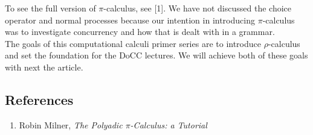 \documentclass[12pt]{article}
\numberwithin{equation}{section}
\begin{document}
To see the full version of $\pi$-calculus, see [1]. We have not discussed the choice operator and normal processes because our intention in introducing $\pi$-calculus was to investigate concurrency and how that is dealt with in a grammar. \\

The goals of this computational calculi primer series are to introduce $\rho$-calculus and set the foundation for the DoCC lectures. We will achieve both of these goals with next the article.

\subsection{References}
\begin{enumerate}
\item Robin Milner, \emph{The Polyadic $\pi$-Calculus: a Tutorial} \\

\end{enumerate}

\end{document}

